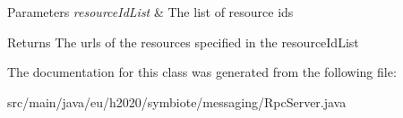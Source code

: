 \begin{DoxyParams}{Parameters}
{\em resource\+Id\+List} & The list of resource ids \\
\hline
\end{DoxyParams}
\begin{DoxyReturn}{Returns}
The urls of the resources specified in the resource\+Id\+List 
\end{DoxyReturn}


The documentation for this class was generated from the following file\+:\begin{DoxyCompactItemize}
\item 
src/main/java/eu/h2020/symbiote/messaging/Rpc\+Server.\+java\end{DoxyCompactItemize}
